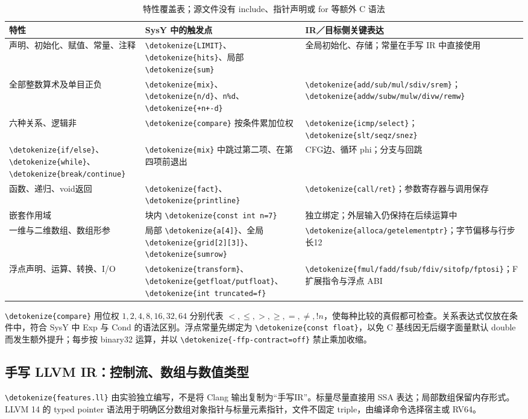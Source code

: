 \documentclass[UTF8,a4paper,10pt,fontset=none]{ctexart}
\newcommand{\code}[1]{{\small\expandafter\nolinkurl\expandafter{\detokenize{#1}}}}
\begin{document}
\begin{table}[H]
\centering\small
\begin{tabularx}{\linewidth}{lYY}
\toprule 特性 & SysY 中的触发点 & IR／目标侧关键表达 \\
\midrule
声明、初始化、赋值、常量、注释 & \code{LIMIT}、\code{hits}、局部 \code{sum} & 全局初始化、存储；常量在手写 IR 中直接使用 \\
全部整数算术及单目正负 & \code{mix}、\code{n/d}、\texttt{n\%d}、\code{+n+-d} & \code{add/sub/mul/sdiv/srem}；\code{addw/subw/mulw/divw/remw} \\
六种关系、逻辑非 & \code{compare} 按条件累加位权 & \code{icmp/select}；\code{slt/seqz/snez} \\
\code{if/else}、\code{while}、\code{break/continue} & \code{mix} 中跳过第二项、在第四项前退出 & CFG边、循环 phi；分支与回跳 \\
函数、递归、void返回 & \code{fact}、\code{printline} & \code{call/ret}；参数寄存器与调用保存 \\
嵌套作用域 & 块内 \code{const int n=7} & 独立绑定；外层输入仍保持在后续运算中 \\
一维与二维数组、数组形参 & 局部 \code{a[4]}、全局 \code{grid[2][3]}、\code{sumrow} & \code{alloca/getelementptr}；字节偏移与行步长12 \\
浮点声明、运算、转换、I/O & \code{transform}、\code{getfloat/putfloat}、\code{int truncated=f} & \code{fmul/fadd/fsub/fdiv/sitofp/fptosi}；F扩展指令与浮点 ABI \\
\bottomrule
\end{tabularx}
\caption{特性覆盖表；源文件没有 include、指针声明或 for 等额外 C 语法}
\end{table}

\code{compare} 用位权 $1,2,4,8,16,32,64$ 分别代表 $<,\leq,>,\geq,=,\ne,!n$，使每种比较的真假都可检查。关系表达式仅放在条件中，符合 SysY 中 Exp 与 Cond 的语法区别。浮点常量先绑定为 \code{const float}，以免 C 基线因无后缀字面量默认 double 而发生额外提升；每步按 binary32 运算，并以 \code{-ffp-contract=off} 禁止乘加收缩。

\subsection{手写 LLVM IR：控制流、数组与数值类型}
\code{features.ll} 由实验独立编写，不是将 Clang 输出复制为“手写IR”。标量尽量直接用 SSA 表达；局部数组保留内存形式。LLVM 14 的 typed pointer 语法用于明确区分数组对象指针与标量元素指针，文件不固定 triple，由编译命令选择宿主或 RV64。
\end{document}
